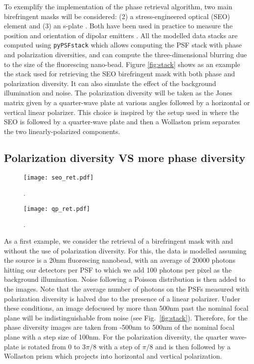 \documentclass[reprint,aps,pra,superscriptaddress,
amsmath,amssymb]{revtex4-1}
\begin{document}
To exemplify the implementation of the phase retrieval algorithm, 
two main birefringent masks will be considered: (2) a stress-engineered optical 
(SEO) element \cite{} and (3) an s-plate \cite{}. 
Both have been used in practice to measure
the position and orientation of dipolar emitters \cite{}. All the modelled
data stacks are computed using \texttt{pyPSFstack} which allows
computing the PSF stack with phase and polarization diversities, and can 
compute the three-dimensional blurring due to the size of the fluorescing
nano-bead. Figure \ref{fig:stack} shows as an example the stack used for 
retrieving the SEO birefringent mask with both phase and polarization diversity. 
It can also simulate the effect of the background illumination
and noise. The polarization diversity will be taken as the Jones matrix
given by a quarter-wave plate at various angles followed by a horizontal or 
vertical linear polarizer. This choice is inspired by the setup used in \cite{}
where the SEO is followed by a quarter-wave plate and then a Wollaston
prism separates the two linearly-polarized components. 

\subsection{Polarization diversity VS more phase diversity}

\begin{figure}
  \centering
  \texttt{[image: seo\_ret.pdf]}
  \caption{\label{fig:seo_ret} . }
\end{figure}

\begin{figure}
  \centering
  \texttt{[image: qp\_ret.pdf]}
  \caption{\label{fig:qp_ret} . }
\end{figure}

As a first example, we consider the retrieval of a birefringent mask with and without
the use of polarization diversity. For this, the data is modelled assuming 
the source is a 20nm fluorescing nanobead,
with an average of 20000 photons hitting our detectors 
per PSF to which we add 100 photons per pixel 
as the background illumination. Noise following a Poisson distribution
is then added to the images. Note that the average number of photons on the 
PSFs measured with polarization diversity is halved due to the presence of a linear 
polarizer. Under these conditions, an image defocused by more 
than 500nm past the nominal focal plane will be indistinguishable from noise 
(see Fig.~\ref{fig:stack}). 
Therefore, for the phase diversity images are taken from -500nm to 500nm of the 
nominal focal plane with a step size of 100nm. For the polarization diversity, the 
quarter wave-plate is rotated from $0$ to $3\pi/8$ with a step of $\pi/8$ and is
then followed by a Wollaston prism which projects into horizontal and vertical 
polarization.
\end{document}
